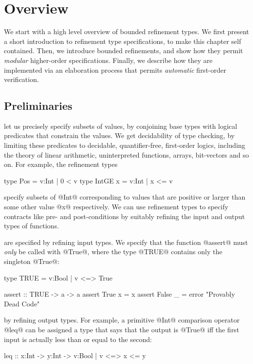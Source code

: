 \section{Overview}\label{sec:boundedrefinementtypes:overview}

We start with a high level overview of bounded refinement types.
%
We first present a short introduction to refinement type specifications, 
to make this chapter self contained.
%
Then, we introduce bounded refinements,
and show how they permit \emph{modular} higher-order specifications.
%
Finally, we describe how they are implemented via an elaboration
process that permits \emph{automatic} first-order verification.

\subsection{Preliminaries}

 let us precisely specify subsets of values,
by conjoining base types with logical predicates that constrain the values.
We get decidability of type checking, by limiting these predicates to
decidable, quantifier-free, first-order logics, including the theory
of linear arithmetic, uninterpreted functions, arrays, bit-vectors
and so on. 
%
For example, the refinement types
%
\begin{code}
  type Pos     = {v:Int | 0 < v}
  type IntGE x = {v:Int | x <= v}
\end{code}
%
specify subsets of @Int@ corresponding to values
that are positive or larger than some other value @x@
respectively. 
%
We can use refinement types to specify contracts
like pre- and post-conditions by suitably refining the input
and output types of functions.

 are specified by refining input types.
We specify that the function @assert@ must
\emph{only} be called with @True@,
%
where the type @TRUE@ contains only the singleton @True@:
%
\begin{code}
  type TRUE = {v:Bool | v <=> True}

  assert         :: TRUE -> a -> a
  assert True x  = x
  assert False _ = error "Provably Dead Code"
\end{code}

 by refining output types.
For example, a primitive @Int@ comparison operator @leq@ can be
assigned a type that says that the output is @True@ iff the
first input is actually less than or equal to the second:
%
\begin{mcode}
  leq :: x:Int -> y:Int -> {v:Bool | v  <=> x <= y}
\end{mcode}

